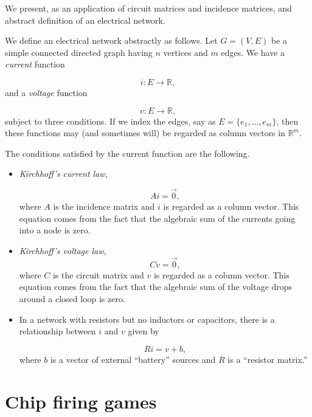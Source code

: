 We present, as an application of
circuit matrices and incidence matrices, and
abstract definition of an electrical network.

We define an electrical network abstractly as follows.
Let $G=(V,E)$ be a simple connected directed graph having $n$
vertices and $m$ edges. We have a {\it current} function

\[
i:E\to {\mathbb{R}},
\]
and a {\it voltage} function

\[
v:E\to {\mathbb{R}},
\]
subject to three conditions. If we index the edges, say as
$E=\{e_1,\dots ,e_m\}$, then these functions may (and sometimes will)
be regarded as column vectors in ${\mathbb{R}}^m$.

The conditions satisfied by the current function
are the following.

\begin{itemize}
\item
{\it Kirchhoff's current law},

\begin{equation}
\label{eqn:node-law}
Ai = \vec{0},
\end{equation}
where $A$ is the incidence matrix and $i$ is regarded as
a column vector.
This equation comes from the fact that the algebraic sum of the
currents going into a node is zero.

\item
{\it Kirchhoff's voltage law},
\begin{equation}
\label{eqn:voltage-law}
Cv = \vec{0},
\end{equation}
where $C$ is the circuit matrix and $v$ is regarded as
a column vector.
This equation comes from the fact that the algebraic sum of the
voltage drops around a closed loop is zero.

\item
In a network with resistors but no inductors or capacitors, there is a
relationship between $i$ and $v$ given by

\[
Ri=v+b,
\]
where $b$ is a vector of external ``battery'' sources
and $R$ is a ``resistor matrix.''

\end{itemize}





\section{Chip firing games}


